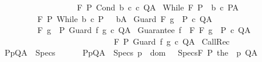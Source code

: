 \begin{isabellebody}
\ \ \ \ \ \ \ \ \ {\isasymLongrightarrow}\ \isanewline
\ \ \ \ \ \ \ \ \ {\isasymGamma}{\isacharcomma}{\isasymTheta}{\isasymturnstile}\isactrlbsub {\isacharslash}F\isactrlesub \ P\ {\isacharparenleft}Cond\ b\ c\ c\ Q{\isacharcomma}A{\isachardoublequoteclose}\isanewline
\isanewline
{\isacharbar}\ While{\isacharcolon}\ {\isachardoublequoteopen}{\isasymGamma}{\isacharcomma}{\isasymTheta}{\isasymturnstile}\isactrlbsub {\isacharslash}F\isactrlesub \ {\isacharparenleft}P\ {\isasyminter}\ b{\isacharparenright}\ c\ P{\isacharcomma}A\isanewline
\ \ \ \ \ \ \ \ \ \ {\isasymLongrightarrow}\isanewline
\ \ \ \ \ \ \ \ \ \ {\isasymGamma}{\isacharcomma}{\isasymTheta}{\isasymturnstile}\isactrlbsub {\isacharslash}F\isactrlesub \ P\ {\isacharparenleft}While\ b\ c{\isacharparenright}\ {\isacharparenleft}P\ {\isasyminter}\ {\isacharminus}\ b{\isacharparenright}{\isacharcomma}A{\isachardoublequoteclose}\isanewline
\isanewline
{\isacharbar}\ Guard{\isacharcolon}\ {\isachardoublequoteopen}{\isasymGamma}{\isacharcomma}{\isasymTheta}{\isasymturnstile}\isactrlbsub {\isacharslash}F\isactrlesub \ {\isacharparenleft}g\ {\isasyminter}\ P{\isacharparenright}\ c\ Q{\isacharcomma}A\isanewline
\ \ \ \ \ \ \ \ \ \ {\isasymLongrightarrow}\isanewline
\ \ \ \ \ \ \ \ \ \ {\isasymGamma}{\isacharcomma}{\isasymTheta}{\isasymturnstile}\isactrlbsub {\isacharslash}F\isactrlesub \ {\isacharparenleft}g\ {\isasyminter}\ P{\isacharparenright}\ {\isacharparenleft}Guard\ f\ g\ c{\isacharparenright}\ Q{\isacharcomma}A{\isachardoublequoteclose}\isanewline
\isanewline
{\isacharbar}\ Guarantee{\isacharcolon}\ {\isachardoublequoteopen}{\isasymlbrakk}f\ {\isasymin}\ F{\isacharsemicolon}\ {\isasymGamma}{\isacharcomma}{\isasymTheta}{\isasymturnstile}\isactrlbsub {\isacharslash}F\isactrlesub \ {\isacharparenleft}g\ {\isasyminter}\ P{\isacharparenright}\ c\ Q{\isacharcomma}A{\isasymrbrakk}\isanewline
\ \ \ \ \ \ \ \ \ \ \ \ \ \ {\isasymLongrightarrow}\isanewline
\ \ \ \ \ \ \ \ \ \ \ \ \ \ {\isasymGamma}{\isacharcomma}{\isasymTheta}{\isasymturnstile}\isactrlbsub {\isacharslash}F\isactrlesub \ P\ {\isacharparenleft}Guard\ f\ g\ c{\isacharparenright}\ Q{\isacharcomma}A{\isachardoublequoteclose}\isanewline
\isanewline
{\isacharbar}\ CallRec{\isacharcolon}\isanewline
\ \ {\isachardoublequoteopen}{\isasymlbrakk}{\isacharparenleft}P{\isacharcomma}p{\isacharcomma}Q{\isacharcomma}A{\isacharparenright}\ {\isasymin}\ Specs{\isacharsemicolon}\ \ \isanewline
\ \ \ \ {\isasymforall}{\isacharparenleft}P{\isacharcomma}p{\isacharcomma}Q{\isacharcomma}A{\isacharparenright}\ {\isasymin}\ Specs{\isachardot}\ p\ {\isasymin}\ dom\ {\isasymGamma}\ {\isasymand}\ {\isasymGamma}{\isacharcomma}{\isasymTheta}{\isasymunion}Specs{\isasymturnstile}\isactrlbsub {\isacharslash}F\isactrlesub \ P\ {\isacharparenleft}the\ {\isacharparenleft}{\isasymGamma}\ p{\isacharparenright}{\isacharparenright}\ Q{\isacharcomma}A\ {\isasymrbrakk}\isanewline

\end{isabellebody}
